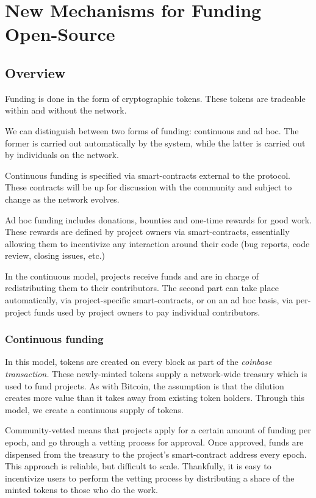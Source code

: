 \section{New Mechanisms for Funding Open-Source}

\subsection{Overview}

Funding is done in the form of cryptographic tokens. These tokens are tradeable
within and without the network.

We can distinguish between two forms of funding: continuous and ad hoc. The
former is carried out automatically by the system, while the latter is carried
out by individuals on the network.

Continuous funding is specified via smart-contracts external to the protocol.
These contracts will be up for discussion with the community and subject to
change as the network evolves.

Ad hoc funding includes donations, bounties and one-time rewards for good work.
These rewards are defined by project owners via smart-contracts, essentially
allowing them to incentivize any interaction around their code (bug reports,
code review, closing issues, etc.)

In the continuous model, projects receive funds and are in charge of
redistributing them to their contributors. The second part can take place
automatically, via project-specific smart-contracts, or on an ad hoc basis, via
per-project funds used by project owners to pay individual contributors.

\subsubsection{Continuous funding}

In this model, tokens are created on every block as part of the \emph{coinbase
transaction.} These newly-minted tokens supply a network-wide treasury which is
used to fund projects. As with Bitcoin, the assumption is that the dilution
creates more value than it takes away from existing token holders. Through this
model, we create a continuous supply of tokens.

Community-vetted means that projects apply for a certain amount of funding per
epoch, and go through a vetting process for approval. Once approved, funds are
dispensed from the treasury to the project’s smart-contract address every
epoch. This approach is reliable, but difficult to scale. Thankfully, it is
easy to incentivize users to perform the vetting process by distributing a
share of the minted tokens to those who do the work.

